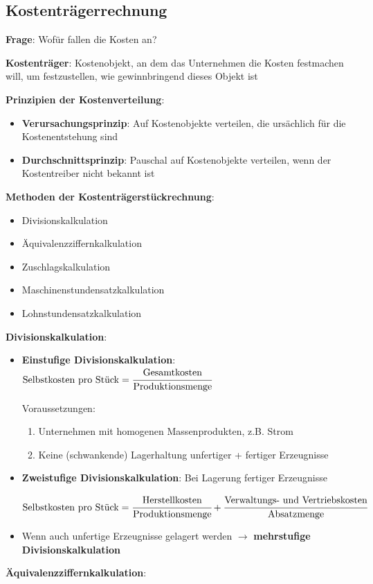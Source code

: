 \subsection{Kostenträgerrechnung}
\textbf{Frage}: Wofür fallen die  Kosten an?

\textbf{Kostenträger}: Kostenobjekt, an dem das Unternehmen die Kosten festmachen will, um festzustellen, wie gewinnbringend dieses Objekt ist

\textbf{Prinzipien der Kostenverteilung}:
\begin{itemize}
	\item \textbf{Verursachungsprinzip}: Auf Kostenobjekte verteilen, die ursächlich für die
	Kostenentstehung sind
	\item \textbf{Durchschnittsprinzip}: Pauschal auf Kostenobjekte verteilen, wenn der
	Kostentreiber nicht bekannt ist
\end{itemize}

\textbf{Methoden der Kostenträgerstückrechnung}:
\begin{itemize}
	\item Divisionskalkulation
	\item Äquivalenzziffernkalkulation
	\item Zuschlagskalkulation
	\item Maschinenstundensatzkalkulation
	\item Lohnstundensatzkalkulation
\end{itemize}
\bigskip
\textbf{Divisionskalkulation}:
\begin{itemize}
	\item \textbf{Einstufige Divisionskalkulation}: $\text{Selbstkosten pro Stück}=\cfrac{\text{Gesamtkosten}}{\text{Produktionsmenge}}$
	
	Voraussetzungen: 
	\begin{enumerate}
		\item Unternehmen mit homogenen Massenprodukten, z.B. Strom
		\item Keine (schwankende) Lagerhaltung unfertiger + fertiger Erzeugnisse
	\end{enumerate}

	\item \textbf{Zweistufige Divisionskalkulation}: Bei Lagerung fertiger Erzeugnisse
	\begin{tightcenter}
		$\text{Selbstkosten pro Stück}=
		\cfrac{\text{Herstellkosten}}{\text{Produktionsmenge}}+
		\cfrac{\text{Verwaltungs- und Vertriebskosten}}{\text{Absatzmenge}}$
	\end{tightcenter}
	\item Wenn auch unfertige Erzeugnisse gelagert werden $\rightarrow$ \textbf{mehrstufige Divisionskalkulation}
\end{itemize}
\bigskip
\textbf{Äquivalenzziffernkalkulation}: